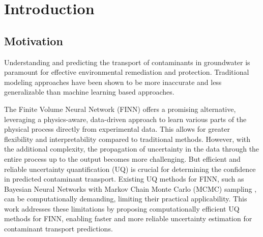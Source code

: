 \section{Introduction}

\subsection{Motivation}
%
%
%
%
%

Understanding and predicting the transport of contaminants in groundwater is paramount for effective environmental remediation and protection. Traditional modeling approaches have been shown to be more inaccurate and less generalizable \cite{finn} than machine learning based approaches. %

The Finite Volume Neural Network (FINN) \cite{finn} offers a promising alternative, leveraging a physics-aware, data-driven approach to learn various parts of the physical process directly from experimental data. This allows for greater flexibility and interpretability compared to traditional methods. However, with the additional complexity, the propagation of uncertainty in the data through the entire process up to the output becomes more challenging. But efficient and reliable uncertainty quantification (UQ) is crucial for determining the confidence in predicted contaminant transport. Existing UQ methods for FINN, such as Bayesian Neural Networks with Markov Chain Monte Carlo (MCMC) sampling \cite{bardenet2017markov}, can be computationally demanding, limiting their practical applicability. This work addresses these limitations by proposing computationally efficient UQ methods for FINN, enabling faster and more reliable uncertainty estimation for contaminant transport predictions.


